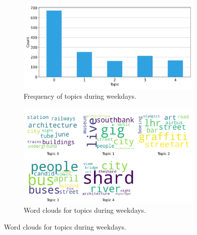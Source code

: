 \documentclass{article}
\theoremstyle{definition}
\theoremstyle{remark}
\begin{document}
\begin{figure}[!h]
    \centering
    \begin{subfigure}{0.45\textwidth}
        \centering
        \includegraphics[width=\linewidth]{figures/places_sense_weekday_locals.png} 
        \caption{Frequency of topics during weekdays.}
        \label{fig:places_sense_weekday_locals}
    \end{subfigure}
    \hfill
    \begin{subfigure}{0.5\textwidth}
        \centering
        \includegraphics[width=\linewidth]{figures/topics_weekday_locals.png} 
        \caption{Word clouds for topics during weekdays.}
        \label{fig:topics_weekday_locals}
    \end{subfigure}


\end{figure}
\end{document}
